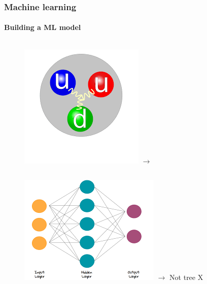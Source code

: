\documentclass[aspectratio=43]{beamer}
\begin{document}
\begin{frame}

	\frametitle{Machine learning}
	\framesubtitle{Building a ML model}
	
	\begin{figure}
		
		\begin{columns}
			\includegraphics[width = \linewidth]{proton.png}
			$\longrightarrow$
		\end{columns}
		\endminipage
		\hspace*{-1.25cm}	
		\includegraphics[width = 1.25\linewidth]{NN.png}
		\endminipage
		\hspace*{0.75cm}
		$\longrightarrow$
		{\color{darkred}Not tree X}
		\endminipage
		
	\end{figure}

\end{frame}
\end{document}
